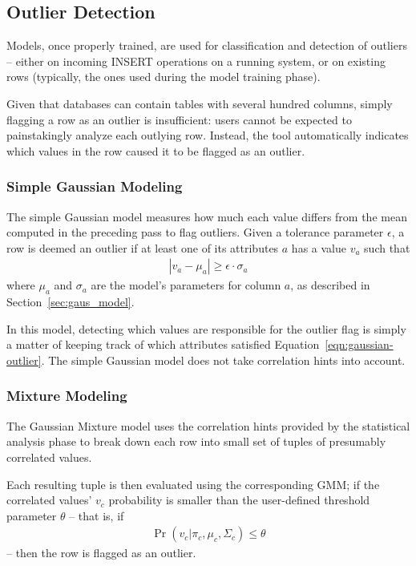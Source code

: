 \subsection{Outlier Detection}
\label{sec:outlier-detection}

Models, once properly trained, are used for classification and detection of outliers -- either on incoming INSERT operations on a running system, or on existing rows (typically, the ones used during the model training phase). %

Given that databases can contain tables with several hundred columns, simply flagging a row as an outlier is insufficient: users cannot be expected to painstakingly analyze each outlying row. Instead, the tool automatically indicates which values in the row caused it to be flagged as an outlier.

\subsubsection{Simple Gaussian Modeling}
The simple Gaussian model measures how much each value differs from the mean computed in the preceding pass to flag outliers. Given a tolerance parameter $\epsilon$, a row is deemed an outlier if at least one of its attributes $a$ has a value $v_a$ such that
\begin{align}
  |v_a - \mu_a| \ge \epsilon \cdot \sigma_a
  \label{eqn:gaussian-outlier}
\end{align}
where $\mu_a$ and $\sigma_a$ are the model's parameters for column $a$, as described in Section~\ref{sec:gaus_model}.

In this model, detecting which values are responsible for the outlier flag is simply a matter of keeping track of which attributes satisfied Equation~\ref{eqn:gaussian-outlier}. The simple Gaussian model does not take correlation hints into account.

\subsubsection{Mixture Modeling}
The Gaussian Mixture model uses the correlation hints provided by the statistical analysis phase to break down each row into small set of tuples of presumably correlated values.

Each resulting tuple is then evaluated using the corresponding GMM; if the correlated values' $v_c$ probability is smaller than the user-defined threshold parameter $\theta$ -- that is, if
\begin{align}
  \Pr(v_c | \pi_c, \mu_c, \Sigma_c) \leq \theta
  \label{eqn:mixture-outlier}
\end{align}
 -- then the row is flagged as an outlier.

